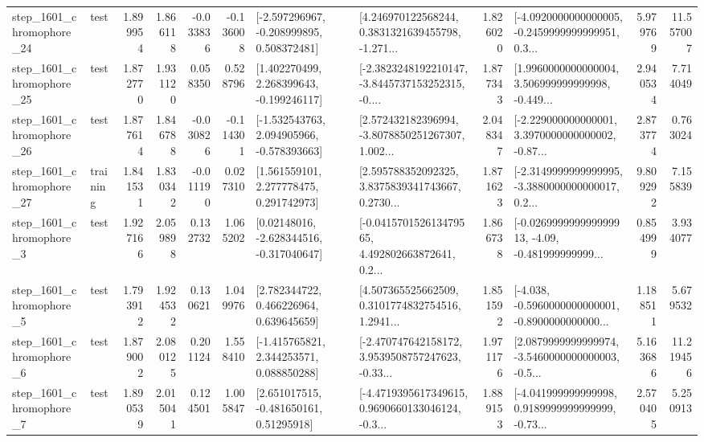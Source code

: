 \begin{tabular}{llrrrrllrlrr}
 step\_1601\_chromophore\_24 &      test &      1.899954 &    1.866118 &     -0.033836 & -0.136008 &   [-2.597296967, -0.208999895, 0.508372481] &  [4.246970122568244, 0.3831321639455798, -1.271... &       1.826020 &  [-4.0920000000000005, -0.2459999999999951, 0.3... &            5.979769 &         11.557007 \\
 step\_1601\_chromophore\_25 &      test &      1.872770 &    1.931120 &      0.058350 &  0.528796 &    [1.402270499, 2.268399643, -0.199246117] &  [-2.3823248192210147, -3.8445737153252315, -0.... &       1.877343 &  [1.9960000000000004, 3.506999999999998, -0.449... &            2.940534 &          7.714049 \\
 step\_1601\_chromophore\_26 &      test &      1.877614 &    1.846788 &     -0.030826 & -0.114301 &   [-1.532543763, 2.094905966, -0.578393663] &  [2.572432182396994, -3.8078850251267307, 1.002... &       2.048347 &  [-2.229000000000001, 3.3970000000000002, -0.87... &            2.873774 &          0.763024 \\
 step\_1601\_chromophore\_27 &  training &      1.841531 &    1.830342 &     -0.011190 &  0.027310 &     [1.561559101, 2.277778475, 0.291742973] &  [2.595788352092325, 3.8375839341743667, 0.2730... &       1.871623 &  [-2.3149999999999995, -3.3880000000000017, 0.2... &            9.809292 &          7.155839 \\
  step\_1601\_chromophore\_3 &      test &      1.927166 &    2.059898 &      0.132732 &  1.065202 &    [0.02148016, -2.628344516, -0.317040647] &  [-0.041570152613479565, 4.492802663872641, 0.2... &       1.866738 &  [-0.026999999999999913, -4.09, -0.481999999999... &            0.854999 &          3.934077 \\
  step\_1601\_chromophore\_5 &      test &      1.793912 &    1.924532 &      0.130621 &  1.049976 &     [2.782344722, 0.466226964, 0.639645659] &  [4.507365525662509, 0.3101774832754516, 1.2941... &       1.851592 &  [-4.038, -0.5960000000000001, -0.8900000000000... &            1.188511 &          5.679532 \\
  step\_1601\_chromophore\_6 &      test &      1.879002 &    2.080125 &      0.201124 &  1.558410 &    [-1.415765821, 2.344253571, 0.088850288] &  [-2.470747642158172, 3.9539508757247623, -0.33... &       1.971176 &  [2.0879999999999974, -3.5460000000000003, -0.5... &            5.163686 &         11.219456 \\
  step\_1601\_chromophore\_7 &      test &      1.890539 &    2.015041 &      0.124501 &  1.005847 &     [2.651017515, -0.481650161, 0.51295918] &  [-4.4719395617349615, 0.9690660133046124, -0.3... &       1.889153 &  [-4.041999999999998, 0.9189999999999999, -0.73... &            2.570405 &          5.250913 \\

\end{tabular}
